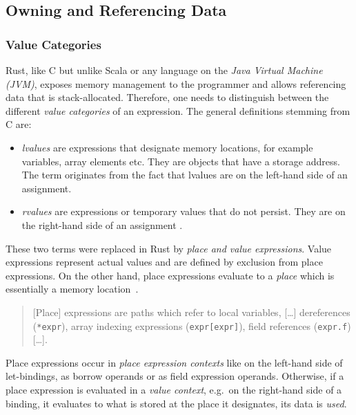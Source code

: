 \subsection{Owning and Referencing Data}

\subsubsection{Value Categories}

Rust, like C but unlike Scala or any language on the \emph{Java Virtual Machine
(JVM)}, exposes memory management to the programmer and allows referencing data
that is stack-allocated. Therefore, one needs to distinguish between the
different \emph{value categories} of an expression. The general definitions
stemming from C are:

\begin{itemize}
\tightlist
\item
  \emph{lvalues} are expressions that designate memory locations, for
  example variables, array elements etc. They are objects that have a
  storage address. The term originates from the fact that lvalues are on
  the left-hand side of an assignment.
\item
  \emph{rvalues} are expressions or temporary values that do not
  persist. They are on the right-hand side of an assignment \cite{wiki:lvalues}.
\end{itemize}

These two terms were replaced in Rust by \emph{place and value expressions}.
Value expressions represent actual values and are defined by exclusion from
place expressions. On the other hand, place expressions evaluate to a
\emph{place} which is essentially a memory location~\cite{rustref}.

\begin{quote}
{[}Place{]} expressions are paths which refer to local variables,
{[}\ldots{]} dereferences (\passthrough{\lstinline!*expr!}), array
indexing expressions (\passthrough{\lstinline!expr[expr]!}), field
references (\passthrough{\lstinline!expr.f!}) {[}\ldots{]}. \\
\cite[section ``Expressions'']{rustref}
\end{quote}

Place expressions occur in \emph{place expression contexts} like on the
left-hand side of let-bindings, as borrow operands or as field expression
operands. Otherwise, if a place expression is evaluated in a \emph{value
context}, e.g.~on the right-hand side of a binding, it evaluates to what is
stored at the place it designates, its data is \emph{used}.

